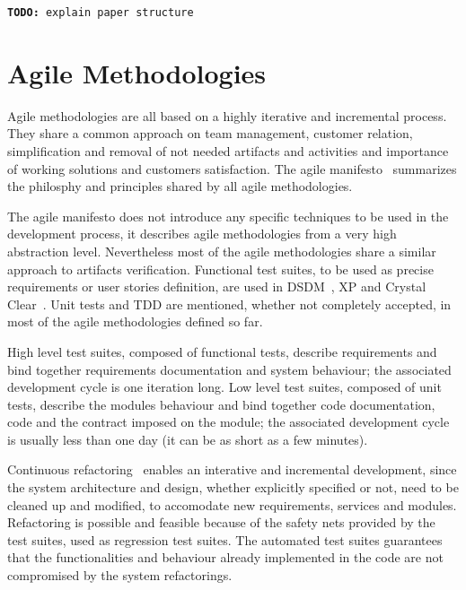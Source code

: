 \documentclass{article}
\newcommand{\todo}[1]{\texttt{\textbf{TODO:} #1}}
\begin{document}
\todo{explain paper structure}



\section{Agile Methodologies}
\label{sec:agile_methodologies}

Agile methodologies are all based on a highly iterative and incremental process.
They share a common approach on team management, customer relation, simplification and removal of not needed artifacts and activities and importance of working solutions and customers satisfaction.
The agile manifesto~\cite{Beck2001} summarizes the philosphy and principles shared by all agile methodologies.

The agile manifesto does not introduce any specific techniques to be used in the development process, it describes agile methodologies from a very high abstraction level.
Nevertheless most of the agile methodologies share a similar approach to artifacts verification.
Functional test suites, to be used as precise requirements or user stories definition, are used in DSDM~\cite{Stapleton1997}, XP and Crystal Clear~\cite{Cockburn2004}. 
Unit tests and TDD are mentioned, whether not completely accepted, in most of the agile methodologies defined so far.

High level test suites, composed of functional tests, describe requirements and bind together requirements documentation and system behaviour; the associated development cycle is one iteration long. 
Low level test suites, composed of unit tests, describe the modules behaviour and bind together code documentation, code and the contract imposed on the module; the associated development cycle is usually less than one day (it can be as short as a few minutes).

Continuous refactoring~\cite{Fowler1999} enables an interative and incremental development, since the system architecture and design, whether explicitly specified or not, need to be cleaned up and modified, to accomodate new requirements, services and modules.
Refactoring is possible and feasible because of the safety nets provided by the test suites, used as regression test suites.
The automated test suites guarantees that the functionalities and behaviour already implemented in the code are not compromised by the system refactorings.
\end{document}
